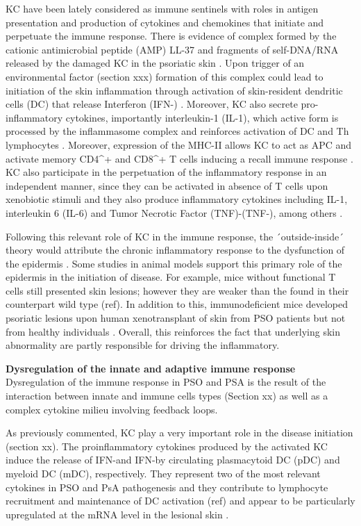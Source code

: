 KC have been lately considered as immune sentinels with roles in antigen presentation and production of cytokines and chemokines that initiate and perpetuate the immune response. There is evidence of complex formed by the cationic antimicrobial peptide (AMP) LL-37 and fragments of self-DNA/RNA released by the damaged KC in the psoriatic skin \parencite{Lande2007}. Upon trigger of an environmental factor (section xxx) formation of this complex could lead to initiation of the skin inflammation through activation of skin-resident dendritic cells (DC) that release Interferon \gamma (IFN-\gamma) \parencite{Nestle2005}. Moreover, KC also secrete pro-inflammatory cytokines, importantly interleukin-1 (IL-1), which active form is processed by the inflammasome complex and reinforces activation of DC and Th lymphocytes \parencite{Feldmeyer2007, Arend2008}.%
Moreover, expression of the MHC-II allows KC to act as APC and activate memory CD4^+ and CD8^+ T cells inducing a recall immune response \parencite{Black2007}. KC also participate in the perpetuation of the inflammatory response in an independent manner, since they can be activated in absence of T cells upon xenobiotic stimuli \parencite{Griffiths1989} and they also produce inflammatory cytokines including IL-1, interleukin 6 (IL-6) and Tumor Necrotic Factor (TNF)-\alpha (TNF-\alpha), among others \parencite{Nestle2009}.

Following this relevant role of KC in the immune response, the ´outside-inside´ theory would attribute the chronic inflammatory response to the dysfunction of the  epidermis . Some studies in animal models support this primary role of the epidermis in the initiation of disease. For example, mice without functional T cells still presented skin lesions; however they are weaker than the found in their counterpart wild type (ref). In addition to this, immunodeficient mice developed psoriatic lesions upon human xenotransplant of skin from PSO patients but not from healthy individuals \parencite{Boyman2004}. Overall, this reinforces the fact that underlying skin abnormality are partly responsible for driving the inflammatory.


\textbf{Dysregulation of the innate and adaptive immune response}
Dysregulation of the immune response in PSO and PSA is the result of the interaction between innate and immune cells types (Section xx) as well as a complex cytokine milieu involving feedback loops.

As previously commented, KC play a very important role in the disease initiation (section xx). The proinflammatory cytokines produced by the activated KC induce the release of IFN-\alpha and IFN-\gamma by circulating plasmacytoid DC (pDC) and myeloid DC (mDC), respectively. They represent two of the most relevant cytokines in PSO and PsA pathogenesis and they contribute to lymphocyte recruitment and maintenance of DC activation (ref) and appear to be particularly upregulated at the mRNA level in the lesional skin \parencite{Schmid1994}. 

